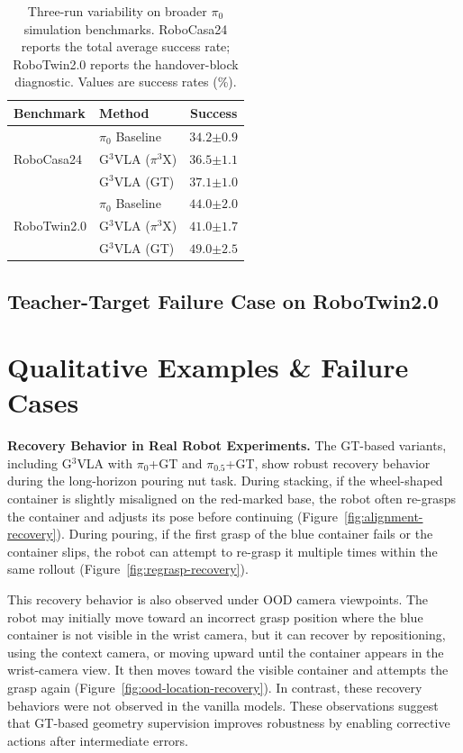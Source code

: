 \begin{table}[H]
\centering
\small
\setlength{\tabcolsep}{4pt}
\begin{tabular}{llc}
\toprule
Benchmark & Method & Success \\
\midrule
\multirow{3}{*}{RoboCasa24}
& $\pi_0$ Baseline & $34.2{\scriptstyle \pm 0.9}$ \\
& G$^3$VLA ($\pi^3$X) & $36.5{\scriptstyle \pm 1.1}$ \\
& G$^3$VLA (GT) & $37.1{\scriptstyle \pm 1.0}$ \\
\midrule
\multirow{3}{*}{RoboTwin2.0}
& $\pi_0$ Baseline & $44.0{\scriptstyle \pm 2.0}$ \\
& G$^3$VLA ($\pi^3$X) & $41.0{\scriptstyle \pm 1.7}$ \\
& G$^3$VLA (GT) & $49.0{\scriptstyle \pm 2.5}$ \\
\bottomrule
\end{tabular}
\caption{Three-run variability on broader $\pi_0$ simulation benchmarks. RoboCasa24 reports the total average success rate; RoboTwin2.0 reports the handover-block diagnostic. Values are success rates (\%).}
\label{tab:broader_pi0_three_run}
\end{table}

\subsection{Teacher-Target Failure Case on RoboTwin2.0}
\label{app:robotwin_teacher_failure}



\section{Qualitative Examples \& Failure Cases}
\label{app:qualitative_example}
\textbf{Recovery Behavior in Real Robot Experiments.}
The GT-based variants, including G$^3$VLA with \(\pi_0\)+GT and \(\pi_{0.5}\)+GT, show robust recovery behavior during the long-horizon pouring nut task. During stacking, if the wheel-shaped container is slightly misaligned on the red-marked base, the robot often re-grasps the container and adjusts its pose before continuing (Figure~\ref{fig:alignment-recovery}). During pouring, if the first grasp of the blue container fails or the container slips, the robot can attempt to re-grasp it multiple times within the same rollout (Figure~\ref{fig:regrasp-recovery}).
 
This recovery behavior is also observed under OOD camera viewpoints. The robot may initially move toward an incorrect grasp position where the blue container is not visible in the wrist camera, but it can recover by repositioning, using the context camera, or moving upward until the container appears in the wrist-camera view. It then moves toward the visible container and attempts the grasp again (Figure~\ref{fig:ood-location-recovery}). In contrast, these recovery behaviors were not observed in the vanilla models. These observations suggest that GT-based geometry supervision improves robustness by enabling corrective actions after intermediate errors.

